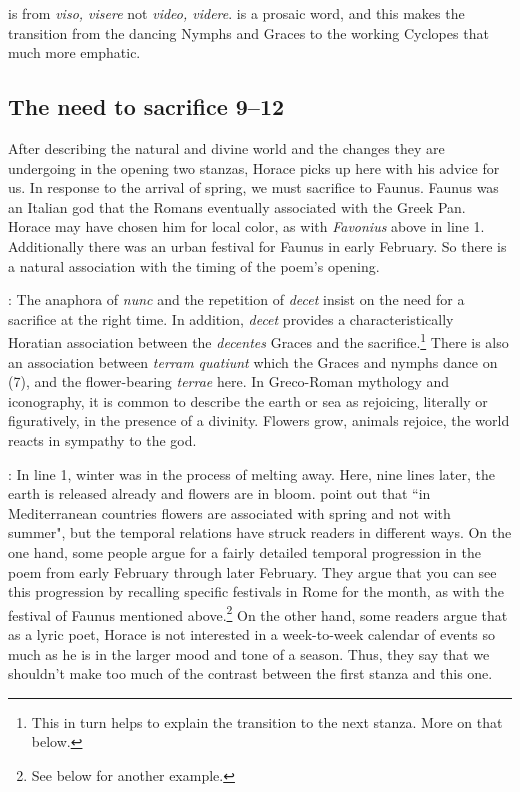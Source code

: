 
 is from \textit{viso, visere} not \textit{video, videre}.\indent{} is a prosaic word, and this makes the transition from the dancing Nymphs and Graces to the working Cyclopes that much more emphatic.


\subsection*{The need to sacrifice 9--12}

After describing the natural and divine world and the changes they are undergoing in the opening two stanzas, Horace picks up here with his advice for us.  In response to the arrival of spring, we must sacrifice to Faunus.  Faunus was an Italian god that the Romans eventually associated with the Greek Pan.  Horace may have chosen him for local color, as with \textit{Favonius} above in line 1. Additionally there was an urban festival for Faunus in early February.  So there is a natural association with the timing of the poem's opening.


: The anaphora of \textit{nunc} and the repetition of \textit{decet} insist on the need for a sacrifice at the right time.  In addition, \textit{decet} provides a characteristically Horatian association between the \textit{decentes} Graces and the sacrifice.\footnote{This in turn helps to explain the transition to the next stanza.  More on that below.}  There is also an association between \textit{terram quatiunt} which the Graces and nymphs dance on (7), and the flower-bearing \textit{terrae} here.  In Greco-Roman mythology and iconography, it is common to describe the earth or sea as rejoicing, literally or figuratively, in the presence of a divinity.  Flowers grow, animals rejoice, the world reacts in sympathy to the god.


: In line 1, winter was in the process of melting away.  Here, nine lines later, the earth is released already and flowers are in bloom.  \citet[66]{nh1989} point out that ``in Mediterranean countries flowers are associated with spring and not with summer", but the temporal relations have struck readers in different ways.  On the one hand, some people argue for a fairly detailed temporal progression in the poem from early February through later February.  They argue that you can see this progression by recalling specific festivals in Rome for the month, as with the festival of Faunus mentioned above.\footnote{See below for another example.}  On the other hand, some readers argue that as a lyric poet, Horace is not interested in a week-to-week calendar of events so much as he is in the larger mood and tone of a season.  Thus, they say that we shouldn't make too much of the contrast between the first stanza and this one.

